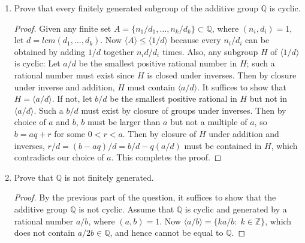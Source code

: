 \documentclass{article}
\begin{document}
\begin{enumerate}
\begin{enumerate}
\begin{enumerate}
          \item Prove that every finitely generated subgroup of the
            additive group $\mathbb{Q}$ is cyclic.
            \begin{proof}
              Given any finite set
              $A=\{n_1/d_1,\ldots,n_k/d_k\}\subset\mathbb{Q}$, where
              $(n_i,d_i)=1$, let $d=lcm(d_1,\ldots,d_k)$. Now $\langle
              A\rangle\leq\langle 1/d\rangle$ because every $n_i/d_i$ can
              be obtained by adding $1/d$ together $n_id/d_i$ times. Also,
              any subgroup $H$ of $\langle 1/d\rangle$ is cyclic: Let $a/d$
              be the smallest positive rational number in $H$; such a
              rational number must exist since $H$ is closed under
              inverses. Then by closure under inverse and addition, $H$
              must contain $\langle a/d\rangle$. It suffices to show that
              $H=\langle a/d\rangle$. If not, let $b/d$ be the smallest
              positive rational in $H$ but not in $\langle a/d\rangle$.
              Such a $b/d$ must exist by closure of groups under inverses.
              Then by choice of $a$ and $b$, $b$ must be larger than $a$
              but not a multiple of $a$, so $b=aq+r$ for some $0<r<a$. Then
              by closure of $H$ under addition and inverses,
              $r/d=(b-aq)/d=b/d-q(a/d)$ must be contained in $H$, which
              contradicts our choice of $a$. This completes the proof.
            \end{proof}

          \item Prove that $\mathbb{Q}$ is not finitely generated.
            \begin{proof}
              By the previous part of the question, it suffices to show
              that the additive group $\mathbb{Q}$ is not cyclic. Assume
              that $\mathbb{Q}$ is cyclic and generated by a rational
              number $a/b$, where $(a,b)=1$. Now $\langle
              a/b\rangle=\{ka/b:\; k\in\mathbb{Z}\}$, which does not
              contain $a/2b\in\mathbb{Q}$, and hence cannot be equal to
              $\mathbb{Q}$.
            \end{proof}
        \end{enumerate}
    \end{enumerate}


\end{enumerate}
\end{document}
